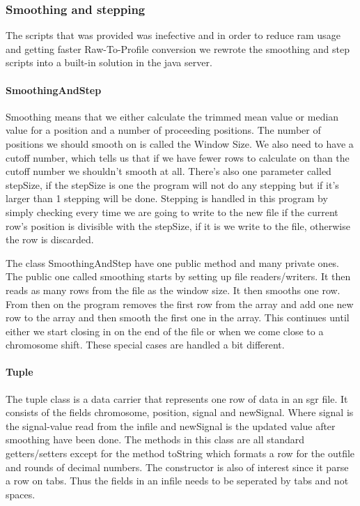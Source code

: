 \subsubsection{Smoothing and stepping}
The scripts that was provided was inefective and in order to reduce ram usage and getting faster Raw-To-Profile conversion we rewrote the smoothing and step scripts into a built-in solution in the java server.

\paragraph{SmoothingAndStep}
Smoothing means that we either calculate the trimmed mean value or median value for a position and a number of proceeding positions. The number of positions we should smooth on is called the Window Size. We also need to have a cutoff number, which tells us that if we have fewer rows to calculate on than the cutoff number we shouldn't smooth at all. There's also one parameter called stepSize, if the stepSize is one the program will not do any stepping but if it's larger than 1 stepping will be done. Stepping is handled in this program by simply checking every time we are going to write to the new file if the current row's position is divisible with the stepSize, if it is we write to the file, otherwise the row is discarded.

The class SmoothingAndStep have one public method and many private ones. The public one called smoothing starts by setting up file readers/writers. It then reads as many rows from the file as the window size. It then smooths one row. From then on the program removes the first row from the array and add one new row to the array and then smooth the first one in the array. This continues until either we start closing in on the end of the file or when we come close to a chromosome shift. These special cases are handled a bit different.




\paragraph{Tuple}
The tuple class is a data carrier that represents one row of data in an sgr file. It consists of the fields chromosome, position, signal and newSignal. Where signal is the signal-value read from the infile and newSignal is the updated value after smoothing have been done.
The methods in this class are all standard getters/setters except for the method toString which formats a row for the outfile and rounds of decimal numbers. The constructor is also of interest since it parse a row on tabs. Thus the fields in an infile needs to be seperated by tabs and not spaces.


